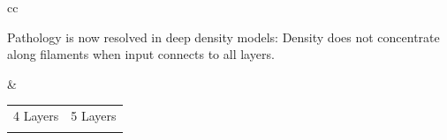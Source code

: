 \documentclass[portrait,a0b,final,a4resizeable]{include/a0poster}
\def\jointspacing{\vspace{0.3in}}
\begin{document}
\begin{poster}
\begin{multicols}{2}
\jointspacing



\newcommand{\gpdrawboxcon}[1]{
\setlength\fboxsep{0pt}
\hspace{-0.4in} 
\fbox{
\texttt{[image: ../../figures/connected\_deep\_sample\_seed\_0/deep\_sample\_connected\_layer\#1]}
}}

\begin{tabular}{cc}
\begin{minipage}[c]{0.4\columnwidth}
Pathology is now resolved in deep density models:  Density does not concentrate along filaments when input connects to all layers.
\end{minipage}
&
\begin{minipage}[c]{0.45\columnwidth}
\centering
\begin{tabular}{cc}
 4 Layers & 5 Layers \\
\gpdrawboxcon{4} &
\gpdrawboxcon{5}
\end{tabular}
\end{minipage}
\end{tabular}

\jointspacing
\jointspacing

\vspace{0.3in}


\end{multicols}
\end{poster}
\end{document}
